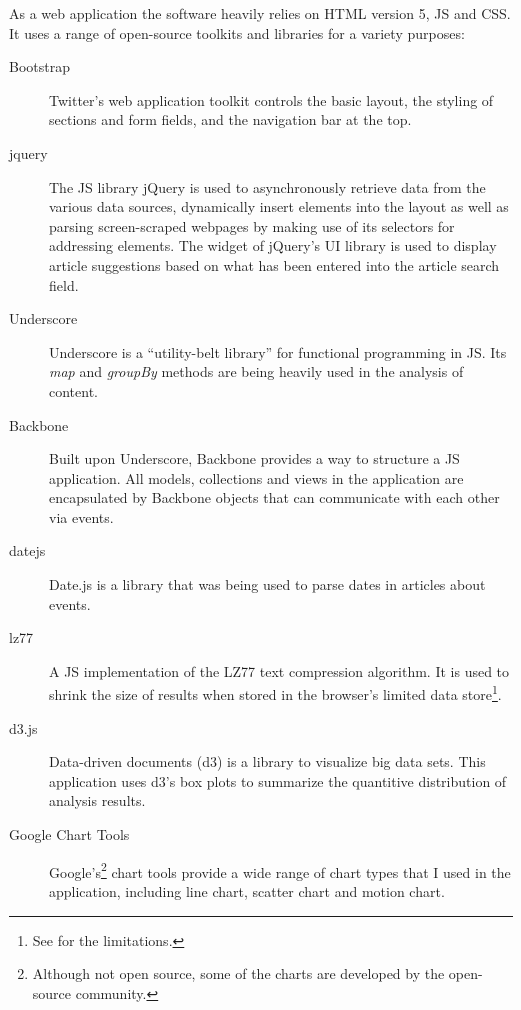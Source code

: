 As a web application the software heavily relies on \ac{HTML} version 5, \ac{JS} and \ac{CSS}. 
It uses a range of open-source toolkits and libraries for a variety purposes:

\begin{description}
  \item[Bootstrap] Twitter's web application toolkit controls the basic layout, the styling of sections and form fields, and the navigation bar at the top.
  \item[jquery] The \ac{JS} library jQuery is used to asynchronously retrieve data from the various data sources, dynamically insert elements into the layout as well as parsing screen-scraped webpages by making use of its selectors for addressing elements.
  The  widget of jQuery's UI library is used to display article suggestions based on what has been entered into the article search field.
  \item[Underscore] Underscore is a ``utility-belt library'' for functional programming in JS. 
  Its \emph{map} and \emph{groupBy} methods are being heavily used in the analysis of content.
  \item[Backbone] Built upon Underscore, Backbone provides a way to structure a \ac{JS} application.
  All models, collections and views in the application are encapsulated by Backbone objects that can communicate with each other via events.
  \item[datejs] Date.js is a library that was being used to parse dates in articles about events.
  \item[lz77] A \ac{JS} implementation of the LZ77 text compression algorithm. 
  It is used to shrink the size of results when stored in the browser's limited data store\footnote{See  for the limitations.}.
  \item[d3.js] Data-driven documents (d3) is a library to visualize big data sets. 
  This application uses d3's box plots to summarize the quantitive distribution of analysis results.
  \item[Google Chart Tools] Google's\footnote{Although not open source, some of the charts are developed by the open-source community.} chart tools provide a wide range of chart types that I used in the application, including line chart, scatter chart and motion chart.
\end{description}

